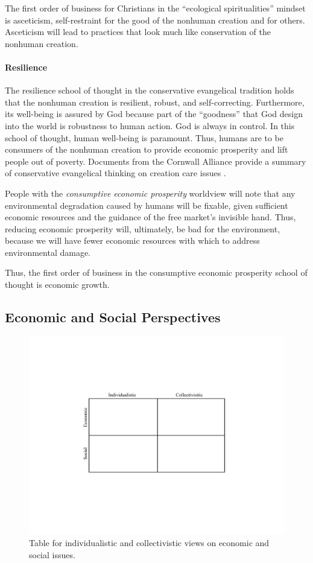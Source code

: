 \documentclass[12pt]{article}
\begin{document}
The first order of business for Christians in the ``ecological spiritualities'' mindset 
is asceticism, self-restraint for the good of the nonhuman creation and for others.
Asceticism will lead to practices that look much like conservation of the nonhuman creation.


\paragraph{Resilience} 
\label{sec:resilience}

The resilience school of thought in the conservative evangelical tradition
holds that the nonhuman creation is resilient, robust, and self-correcting.
Furthermore, its well-being is assured by God because part of the ``goodness'' that God design into the world is robustness to human action.
God is always in control.
In this school of thought, human well-being is paramount. 
Thus, humans are to be consumers of the nonhuman creation 
to provide economic prosperity and
lift people out of poverty.
Documents from the Cornwall Alliance 
provide a summary of conservative evangelical thinking on creation care issues
\autocite{Cornwall:2006aa}.

People with the \emph{consumptive economic prosperity} worldview
will note that any environmental degradation caused by humans will be fixable,
given sufficient economic resources and the guidance of the free market's invisible hand.
Thus, reducing economic prosperity will, ultimately, be bad for the environment, because
we will have fewer economic resources with which to address environmental damage.

Thus, the first order of business in the consumptive economic prosperity school of thought
is economic growth. 


\subsection{Economic and Social Perspectives}
\label{sec:economic_and_social}

\begin{figure}
\centering
\includegraphics[width=0.75\linewidth]{figure_other/QuadTable}
\caption{Table for individualistic and collectivistic views on economic and social issues.}
\label{fig:table}
\end{figure}
\end{document}
